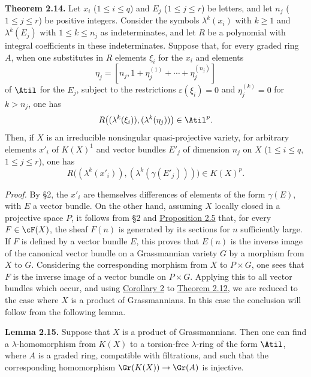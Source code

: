 \textbf{Theorem 2.14.} Let $x_i$ ($1\leq i\leq q$) and $E_j$ ($1\leq j\leq r$) be letters, and let $n_j$ ($1\leq j\leq r$) be positive integers. Consider the symbols $\lambda^k(x_i)$ with $k\geq 1$ and $\lambda^k(E_j)$ with $1\leq k\leq n_j$ as indeterminates, and let $R$ be a polynomial with integral coefficients in these indeterminates. Suppose that, for every graded ring $A$, when one substitutes in $R$ elements $\xi_i$ for the $x_i$ and elements
\[
 \eta_j=[n_j,1+\eta_j^{(1)}+\cdots+\eta_j^{(n_j)}]
\]
of $\Atil$ for the $E_j$, subject to the restrictions $\varepsilon(\xi_i)=0$ and $\eta_j^{(k)}=0$ for $k>n_j$, one has
\[
 R\bigl((\lambda^k(\xi_i)),(\lambda^k(\eta_j))\bigr)\in \Atil^p.
\]
Then, if $X$ is an irreducible nonsingular quasi-projective variety, for arbitrary elements $x'_i$ of $K(X)^1$ and vector bundles $E'_j$ of dimension $n_j$ on $X$ ($1\leq i\leq q$, $1\leq j\leq r$), one has
\begin{equation}\tag{*}
 R\bigl((\lambda^k(x'_i)),(\lambda^k(\gamma(E'_j)))\bigr)\in K(X)^p.
\end{equation}

\emph{Proof.} By \S 2, the $x'_i$ are themselves differences of elements of the form $\gamma(E)$, with $E$ a vector bundle. On the other hand, assuming $X$ locally closed in a projective space $P$, it follows from \S 2 and \hyperlink{sga6.e00.prop.2-5}{Proposition 2.5} that, for every $F\in\cF(X)$, the sheaf $F(n)$ is generated by its sections for $n$ sufficiently large. If $F$ is defined by a vector bundle $E$, this proves that $E(n)$ is the inverse image of the canonical vector bundle on a Grassmannian variety $G$ by a morphism from $X$ to $G$. Considering the corresponding morphism from $X$ to $P\times G$, one sees that $F$ is the inverse image of a vector bundle on $P\times G$. Applying this to all vector bundles which occur, and using \hyperlink{sga6.e00.cor.2}{Corollary 2} to \hyperlink{sga6.e00.thm.2-12}{Theorem 2.12}, we are reduced to the case where $X$ is a product of Grassmannians. In this case the conclusion will follow from the following lemma.

\textbf{Lemma 2.15.} Suppose that $X$ is a product of Grassmannians. Then one can find a $\lambda$-homomorphism from $K(X)$ to a torsion-free $\lambda$-ring of the form $\Atil$, where $A$ is a graded ring, compatible with filtrations, and such that the corresponding homomorphism $\Gr(K(X))\to\Gr(A)$ is injective.

